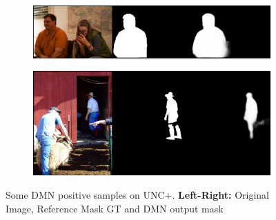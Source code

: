 \begin{figure}[!htbp]
    \ContinuedFloat
	\centering
    \begin{subfigure}[b]{\columnwidth}
            \centering
            \includegraphics[width=\textwidth]{./figures/unc_plus_samples/1.png}
    \end{subfigure}
    \begin{subfigure}[b]{\columnwidth}
            \centering
            \includegraphics[width=\textwidth]{./figures/unc_plus_samples/2.png}
    \end{subfigure}
    
    \caption{Some DMN positive samples on UNC+. \textbf{Left-Right:} Original Image, Reference Mask GT and DMN output mask}
    \label{Fig:UNC+_Pos}
\end{figure}

